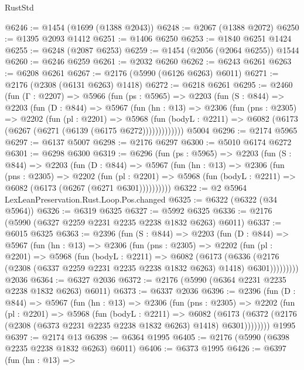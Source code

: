 \begin{lexlean}{RustStd}
\begin{coremodule}
{\begin{coremodule}
{{{{{{{{{{@6246 := @1454 (@1699 (@1388 @2043))
@6248 := @2067 (@1388 @2072)
@6250 := @1395 @2093 @1412
@6251 := @1406 @6250
@6253 := @1840 @6251 @1424
@6255 := @6248 (@2087 @6253)
@6259 := @1454 (@2056 (@2064 @6255)) @1544
@6260 := @6246 @6259
@6261 := @2032 @6260
@6262 := @6243 @6261
@6263 := @6208 @6261
@6267 := @2176 (@5990 (@6126 @6263) @6011)
@6271 := @2176 (@2308 (@6131 @6263) @1418)
@6272 := @6218 @6261
@6295 := @2460
    (fun (Γ : @2207) =>
    @5966
      (fun (ps : @5965) =>
      @2203
        (fun (S : @844) =>
        @2203
          (fun (D : @844) =>
          @5967
            (fun (hn : @13) =>
            @2306
              (fun (pns : @2305) =>
              @2202
                (fun (pl : @2201) =>
                @5968
                  (fun (bodyL : @2211) =>
                  @6082 (@6173 (@6267 (@6271 (@6139 (@6175 @6272)))))))))))))
    @5004
@6296 := @2174 @5965
@6297 := @6137 @5007
@6298 := @2176 @6297
@6300 := @5010 @6174 @6272
@6301 := @6298 @6300
@6319 := @6296
    (fun (ps : @5965) =>
    @2203
      (fun (S : @844) =>
      @2203
        (fun (D : @844) =>
        @5967
          (fun (hn : @13) =>
          @2306
            (fun (pns : @2305) =>
            @2202
              (fun (pl : @2201) =>
              @5968 (fun (bodyL : @2211) => @6082 (@6173 (@6267 (@6271 @6301))))))))))
@6322 := @2 @5964 LexLeanPreservation.Rust.Loop.Pos.changed
@6325 := @6322 (@6322 (@34 @5964))
@6326 := @6319 @6325
@6327 := @5992 @6325
@6336 := @2176 (@5990 (@6327 @2259 @2231 @2235 @2238 @1832 @6263) @6011)
@6337 := @6015 @6325
@6363 := @2396
    (fun (S : @844) =>
    @2203
      (fun (D : @844) =>
      @5967
        (fun (hn : @13) =>
        @2306
          (fun (pns : @2305) =>
          @2202
            (fun (pl : @2201) =>
            @5968
              (fun (bodyL : @2211) =>
              @6082
                (@6173
                  (@6336
                    (@2176 (@2308 (@6337 @2259 @2231 @2235 @2238 @1832 @6263) @1418) @6301)))))))))
    @2036
@6364 := @6327 @2036
@6372 := @2176 (@5990 (@6364 @2231 @2235 @2238 @1832 @6263) @6011)
@6373 := @6337 @2036
@6396 := @2396
    (fun (D : @844) =>
    @5967
      (fun (hn : @13) =>
      @2306
        (fun (pns : @2305) =>
        @2202
          (fun (pl : @2201) =>
          @5968
            (fun (bodyL : @2211) =>
            @6082
              (@6173 (@6372 (@2176 (@2308 (@6373 @2231 @2235 @2238 @1832 @6263) @1418) @6301))))))))
    @1995
@6397 := @2174 @13
@6398 := @6364 @1995
@6405 := @2176 (@5990 (@6398 @2235 @2238 @1832 @6263) @6011)
@6406 := @6373 @1995
@6426 := @6397
    (fun (hn : @13) =>
}}}}}}}}}}
\end{coremodule}}
\end{coremodule}
\end{lexlean}
